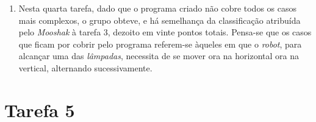 \documentclass[12pt, a4paper]{article}
\begin{document}
\begin{enumerate}

\item Nesta quarta tarefa, dado que o programa criado não cobre todos os casos mais complexos, o grupo obteve, e há semelhança da classificação atribuída pelo \textit{Mooshak} à tarefa 3, dezoito em vinte pontos totais. Pensa-se que os casos que ficam por cobrir pelo programa referem-se àqueles em que o \textit{robot}, para alcançar uma das \textit{lâmpadas}, necessita de se mover ora na horizontal ora na vertical, alternando sucessivamente. 

\end{enumerate}

\section{Tarefa 5}
\end{document}

